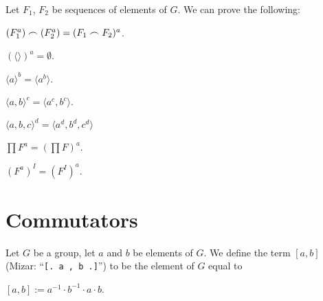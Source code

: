\documentclass{article}
\begin{document}
Let $F_{1}$, $F_{2}$ be sequences of elements of $G$.
We can prove the following:
\begin{thm}
\item\label{group5:9} $(F_{1}^{a})\frown(F_{2}^{a})=(F_{1}\frown F_{2})^{a}$.
\item\label{group5:10} $(\langle\rangle)^{a}=\emptyset$.
\item\label{group5:11} $\langle a\rangle^{b}=\langle a^{b}\rangle$.
\item\label{group5:12} $\langle a,b\rangle^{c}=\langle a^{c},b^{c}\rangle$.
\item\label{group5:13} $\langle a,b,c\rangle^{d}=\langle a^{d},b^{d},c^{d}\rangle$
\item\label{group5:14} $\prod F^{a}=(\prod F)^{a}$.
\item\label{group5:15} $(F^{a})^{I}=(F^{I})^{a}$.
\end{thm}

\section{Commutators}

\begin{definition}
Let $G$ be a group, let $a$ and $b$ be elements of $G$.
We define the term $[a,b]$ (Mizar: ``\verb#[. a , b .]#'') to be the
element of $G$ equal to
\begin{defn}
\item $[a,b]:=a^{-1}\cdot b^{-1}\cdot a\cdot b$.
\end{defn}
\end{definition}
\end{document}
